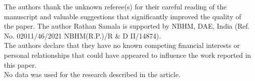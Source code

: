 \documentclass[11pt,a4paper]{amsart}
\theoremstyle{plain}
\theoremstyle{definition}
\theoremstyle{remark}
\numberwithin{equation}{section}
\begin{document}
\newline
{}
The authors thank the unknown referee(s) for their careful reading of the manuscript and valuable suggestions that significantly improved the quality of the paper.
The author Rathan Samala is supported by NBHM, DAE, India (Ref. No. 02011/46/2021 NBHM(R.P.)/R \& D II/14874).\\
\newline
{}
The authors declare that they have no known competing financial interests or personal relationships that could have appeared to influence the work reported in this paper.\\
\newline
{}
No data was used for the research described in the article.


\end{document}

